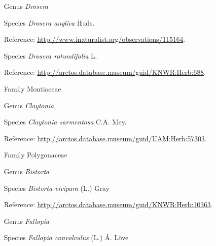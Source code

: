 \documentclass[9pt, article]{memoir}
\begin{document}
\begin{multicols}{2}
\vspace{6pt}\noindent\hspace{30pt}Genus \textit{Drosera}


\vspace{6pt}\noindent\hspace{36pt}Species \textit{Drosera anglica} Huds.


\vspace{6pt}Reference: 
\url{http://www.inaturalist.org/observations/115164}.

\vspace{6pt}\noindent\hspace{36pt}Species \textit{Drosera rotundifolia} L.


\vspace{6pt}Reference: 
\url{http://arctos.database.museum/guid/KNWR:Herb:688}.

\vspace{6pt}\noindent\hspace{24pt}Family Montiaceae


\vspace{6pt}\noindent\hspace{30pt}Genus \textit{Claytonia}


\vspace{6pt}\noindent\hspace{36pt}Species \textit{Claytonia sarmentosa} C.A. Mey.


\vspace{6pt}Reference: 
\url{http://arctos.database.museum/guid/UAM:Herb:57303}.

\vspace{6pt}\noindent\hspace{24pt}Family Polygonaceae


\vspace{6pt}\noindent\hspace{30pt}Genus \textit{Bistorta}


\vspace{6pt}\noindent\hspace{36pt}Species \textit{Bistorta vivipara} (L.) Gray


\vspace{6pt}Reference: 
\url{http://arctos.database.museum/guid/KNWR:Herb:10363}.

\vspace{6pt}\noindent\hspace{30pt}Genus \textit{Fallopia}


\vspace{6pt}\noindent\hspace{36pt}Species \textit{Fallopia convolvulus} (L.) Á. Löve



\end{multicols}
\end{document}
